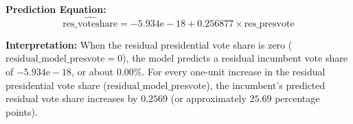 \documentclass[12pt,letterpaper]{article}
\begin{document}
\begin{enumerate}
		\textbf{Prediction Equation:}
		$$\widehat{\text{res\_voteshare}} = -5.934\text{e}-18 + 0.256877 \times \text{res\_presvote}$$
		
		
		
			\textbf{Interpretation:} 
	When the residual presidential vote share is zero ($\text{residual\_model\_presvote} = 0$), the model predicts a residual incumbent vote share of $-5.934\text{e}-18$, or about $0.00\%$. For every one-unit increase in the residual presidential vote share ($\text{residual\_model\_presvote}$), the incumbent's predicted residual vote share increases by $0.2569$ (or approximately $25.69$ percentage points).
	\end{enumerate}
	
	\newpage	
	
\end{document}
